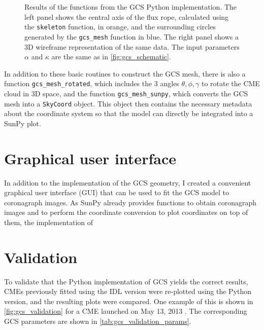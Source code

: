 \begin{figure}
	\centering
	
	\caption[Results of the functions from the GCS Python implementation.]{Results of the functions from the GCS Python implementation. The left panel shows the central axis of the flux rope, calculated using the \texttt{skeleton} function, in orange, and the surrounding circles generated by the \texttt{gcs\_mesh} function in blue. The right panel shows a 3D wireframe representation of the same data. The input parameters $\alpha$ and $\kappa$ are the same as in \autoref{fig:gcs_schematic}.}
	\label{fig:gcs_geometry}
\end{figure}

In addition to these basic routines to construct the GCS mesh, there is also a function \verb|gcs_mesh_rotated|, which includes the 3 angles $\theta, \phi, \gamma$ to rotate the CME cloud in 3D space, and the function \verb|gcs_mesh_sunpy|, which converts the GCS mesh into a \texttt{SkyCoord} object. This object then contains the necessary metadata about the coordinate system so that the model can directly be integrated into a SunPy plot.

\section{Graphical user interface}

In addition to the implementation of the GCS geometry, I created a convenient graphical user interface (GUI) that can be used to fit the GCS model to coronagraph images. As SunPy already provides functions to obtain coronagraph images and to perform the coordinate conversion to plot coordinates on top of them, the implementation of


\section{Validation}

To validate that the Python implementation of GCS yields the correct results, CMEs previously fitted using the IDL version were re-plotted using the Python version, and the resulting plots were compared. One example of this is shown in \autoref{fig:gcs_validation} for a CME launched on May 13, 2013 \citep[originally reconstructed by][Figure 2]{Gou-2020}. The corresponding GCS parameters are shown in \autoref{tab:gcs_validation_params}.

